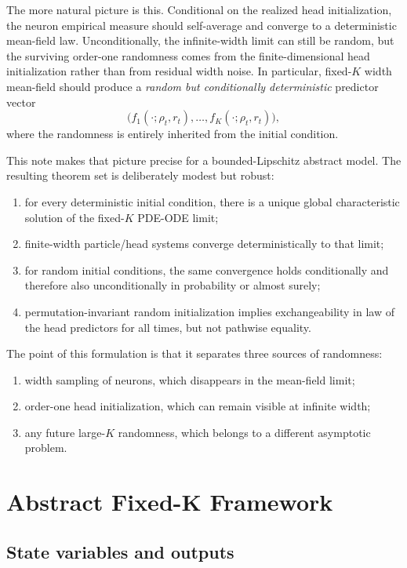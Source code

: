 \documentclass[11pt]{article}
\theoremstyle{definition}
\begin{document}
The more natural picture is this. Conditional on the realized head initialization, the neuron empirical measure should self-average and converge to a deterministic mean-field law. Unconditionally, the infinite-width limit can still be random, but the surviving order-one randomness comes from the finite-dimensional head initialization rather than from residual width noise. In particular, fixed-$K$ width mean-field should produce a \emph{random but conditionally deterministic} predictor vector
\[
  \bigl(
    f_1(\cdot;\rho_t,r_t),\dots,f_K(\cdot;\rho_t,r_t)
  \bigr),
\]
where the randomness is entirely inherited from the initial condition.

This note makes that picture precise for a bounded-Lipschitz abstract model. The resulting theorem set is deliberately modest but robust:
\begin{enumerate}[leftmargin=2em]
  \item for every deterministic initial condition, there is a unique global characteristic solution of the fixed-$K$ PDE-ODE limit;
  \item finite-width particle/head systems converge deterministically to that limit;
  \item for random initial conditions, the same convergence holds conditionally and therefore also unconditionally in probability or almost surely;
  \item permutation-invariant random initialization implies exchangeability in law of the head predictors for all times, but not pathwise equality.
\end{enumerate}

The point of this formulation is that it separates three sources of randomness:
\begin{enumerate}[leftmargin=2em]
  \item width sampling of neurons, which disappears in the mean-field limit;
  \item order-one head initialization, which can remain visible at infinite width;
  \item any future large-$K$ randomness, which belongs to a different asymptotic problem.
\end{enumerate}

\section{Abstract Fixed-K Framework}

\subsection{State variables and outputs}
\end{document}
